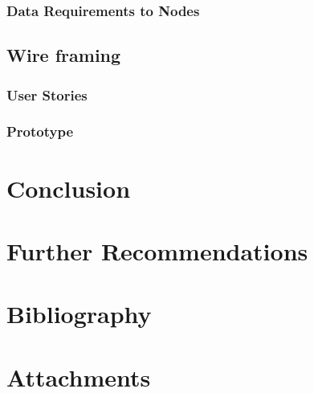 \documentclass[15pt]{article}
\begin{document}
		\subsubsection{Data Requirements to Nodes}
	\subsection{Wire framing}
		\subsubsection{User Stories}
		\subsubsection{Prototype}

\section{Conclusion}

\section{Further Recommendations}

\section{Bibliography}

\section{Attachments}
\end{document}
